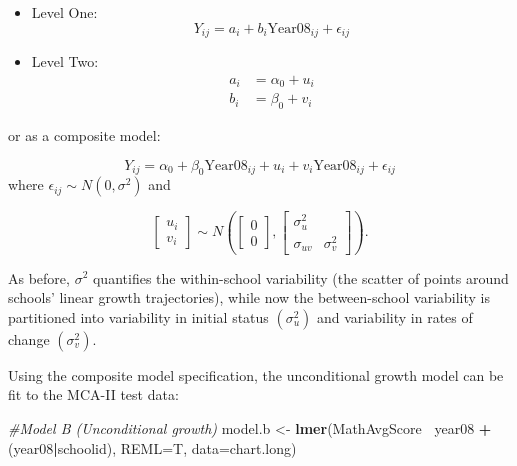 \documentclass[
]{krantz}
\newenvironment{Shaded}{\begin{snugshade}}{\end{snugshade}}
\newcommand{\CommentTok}[1]{\textcolor[rgb]{0.37,0.37,0.37}{\textit{#1}}}
\newcommand{\DataTypeTok}[1]{\textcolor[rgb]{0.27,0.27,0.27}{#1}}
\newcommand{\KeywordTok}[1]{\textcolor[rgb]{0.27,0.27,0.27}{\textbf{#1}}}
\newcommand{\NormalTok}[1]{#1}
\newcommand{\OperatorTok}[1]{\textcolor[rgb]{0.43,0.43,0.43}{\textbf{#1}}}
\newcommand{\StringTok}[1]{\textcolor[rgb]{0.5,0.5,0.5}{#1}}
\begin{document}
\begin{itemize}
\item
  Level One:
  \begin{equation*}
  Y_{ij}=a_{i}+b_{i}\textrm{Year08}_{ij} + \epsilon_{ij}
  \end{equation*}
\item
  Level Two:
  \begin{align*}
  a_{i}&=\alpha_{0} + u_{i}\\
  b_{i}&=\beta_{0} + v_{i}
  \end{align*}
\end{itemize}

or as a composite model:

\begin{equation*}
Y_{ij}=\alpha_{0} + \beta_{0}\textrm{Year08}_{ij}+u_{i}+v_{i}\textrm{Year08}_{ij} + \epsilon_{ij}
\end{equation*}
where \(\epsilon_{ij}\sim N(0,\sigma^2)\) and

\[ \left[ \begin{array}{c}
            u_{i} \\ v_{i}
          \end{array}  \right] \sim N \left( \left[
          \begin{array}{c}
            0 \\ 0
          \end{array} \right], \left[
          \begin{array}{cc}
            \sigma_{u}^{2} & \\
            \sigma_{uv} & \sigma_{v}^{2}
          \end{array} \right] \right) . \]

As before, \(\sigma^2\) quantifies the within-school variability (the scatter of points around schools' linear growth trajectories), while now the between-school variability is partitioned into variability in initial status \((\sigma^2_u)\) and variability in rates of change \((\sigma^2_v)\).

Using the composite model specification, the unconditional growth model can be fit to the MCA-II test data:

\begin{Shaded}
\begin{Highlighting}[]
\CommentTok{#Model B (Unconditional growth)}
\NormalTok{model.b <-}\StringTok{ }\KeywordTok{lmer}\NormalTok{(MathAvgScore}\OperatorTok{~}\StringTok{ }\NormalTok{year08 }\OperatorTok{+}\StringTok{ }\NormalTok{(year08}\OperatorTok{|}\NormalTok{schoolid), }
  \DataTypeTok{REML=}\NormalTok{T, }\DataTypeTok{data=}\NormalTok{chart.long)}
\end{Highlighting}
\end{Shaded}
\end{document}
